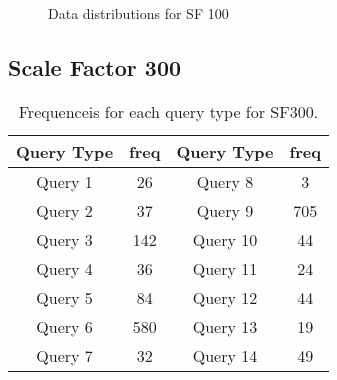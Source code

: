\begin{figure}[H]
\begin{center}
  \caption{Data distributions for SF 100}
  \label{fig:datadistSF10}
\end{center}
\end{figure}

\subsection{Scale Factor 300}

\begin{table}[H]
\centering
    \begin{tabular}{|c|c|c|c|}
    \hline
    Query Type & freq & Query Type & freq \\ 
    \hline
    \hline
    Query 1 & 26 & Query 8 & 3 \\ 
    \hline       
    Query 2 & 37 & Query 9 & 705 \\  
    \hline        
    Query 3 & 142 & Query 10 & 44 \\ 
    \hline       
    Query 4 & 36 & Query 11 &  24 \\ 
    \hline        
    Query 5 & 84 & Query 12 &  44 \\ 
    \hline        
    Query 6 & 580 & Query 13 &  19 \\  
    \hline        
    Query 7 & 32 & Query 14 &  49 \\ 
    \hline
    \end{tabular}
    \caption{Frequenceis for each query type for SF300.}
    \label{table:freqs_sf300}
\end{table}

